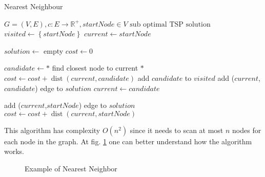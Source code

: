 \begin{algorithm}
    \caption{Nearest Neighbour}\label{algo:greedy}
    \begin{algorithmic}[1]
    \Require $G = (V,E), c:E \to \mathbb{R}^+, startNode \in V$
    \Ensure $\text{sub optimal TSP solution}$
    \State $visited \gets \left \{ startNode \right \}$
    \State $current \gets startNode$




    \State $solution \gets$ empty
    \State $cost \gets 0$




    \State $candidate \gets *$ find closest node to current $*$
    \State $cost \gets cost + \operatorname{dist}(current, candidate)$
    \State add $candidate$ to $visited$
    \State add ($current$,$candidate$) edge to $solution$
    \State $current \gets candidate$
    \EndWhile




    \State add ($current$,$startNode$) edge to $solution$
    \State $cost \gets cost + \operatorname{dist}(current, startNode)$


    \end{algorithmic}
\end{algorithm}

This algorithm has complexity $O(n^2)$ since it needs to scan at most $n$ nodes for each node in the graph. At fig. \ref{fig:greedy} one can better understand how the algorithm works.

\begin{figure}[!h]
    \centering
    \caption{Example of Nearest Neighbor} \label{fig:greedy}
\end{figure}

